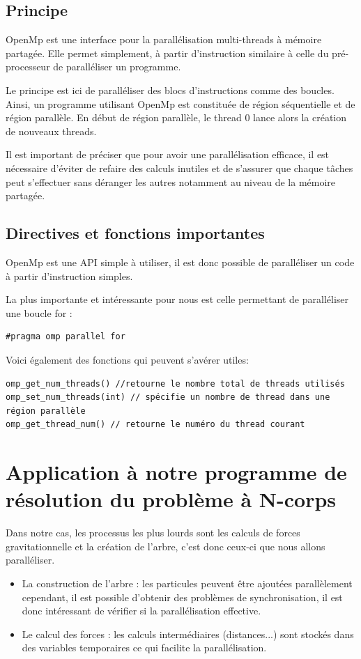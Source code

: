 \subsection{Principe}
OpenMp est une interface pour la parallélisation multi-threads à mémoire partagée. Elle permet simplement, à partir d'instruction similaire à celle du pré-processeur de paralléliser un programme.

Le principe est ici de paralléliser des blocs d'instructions comme des boucles. Ainsi, un programme utilisant OpenMp est constituée de région séquentielle et de région parallèle. En début de région parallèle, le thread 0 lance alors la création de nouveaux threads.

Il est important de préciser que pour avoir une parallélisation efficace, il est nécessaire d'éviter de refaire des calculs inutiles et de s'assurer que chaque tâches peut s'effectuer sans déranger les autres notamment au niveau de la mémoire partagée.

\subsection{Directives et fonctions importantes}
OpenMp est une API simple à utiliser, il est donc possible de paralléliser un code à partir d'instruction simples.

La plus importante et intéressante pour nous est celle permettant de paralléliser une boucle for :

\begin{lstlisting}
#pragma omp parallel for
\end{lstlisting}

Voici également des fonctions qui peuvent s'avérer utiles:

\begin{lstlisting}
omp_get_num_threads() //retourne le nombre total de threads utilisés
omp_set_num_threads(int) // spécifie un nombre de thread dans une région parallèle
omp_get_thread_num() // retourne le numéro du thread courant
\end{lstlisting}

\section{Application à notre programme de résolution du problème à N-corps}

Dans notre cas, les processus les plus lourds sont les calculs de forces gravitationnelle et la création de l'arbre, c'est donc ceux-ci que nous allons paralléliser.

\begin{itemize}
\item La construction de l'arbre : les particules peuvent être ajoutées parallèlement cependant, il est possible d'obtenir des problèmes de synchronisation, il est donc intéressant de vérifier si la parallélisation effective.

\item Le calcul des forces : les calculs intermédiaires (distances...) sont stockés dans des variables temporaires ce qui facilite la parallélisation.
\end{itemize}

